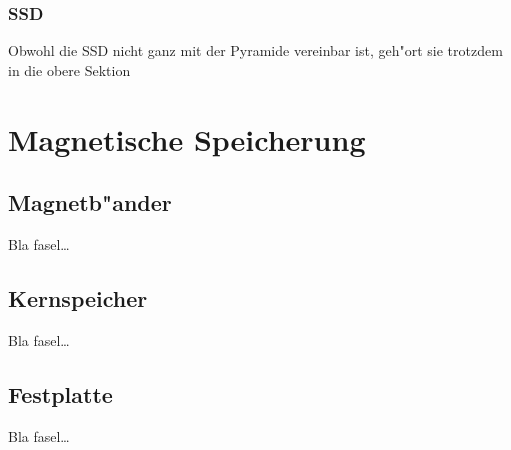 				\subsubsection{SSD}
				\label{ch:Technisch:sec:Elektronische Speicherung:sub:Fl"uchtig:subsub:SSD}
				
				Obwohl die SSD nicht ganz mit der Pyramide vereinbar ist, geh"ort sie trotzdem in die obere Sektion%
				
				
				
			
			
			
    \section{Magnetische Speicherung}
    \label{ch:Technisch:sec:Magnetische Speicherung}
        \subsection{Magnetb"ander}
        \label{ch:Technisch:sec:Magnetische Speicherung:sub:Magnetb"ander}
        
            Bla fasel\ldots
            
        \subsection{Kernspeicher}
        \label{ch:Technisch:sec:Magnetische Speicherung:sub:Kernspeicher}
        
            Bla fasel\ldots
            
        \subsection{Festplatte}
        \label{ch:Technisch:sec:Magnetische Speicherung:sub:Festplatte}
        
            Bla fasel\ldots
    

